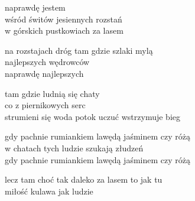 \begin{text}
    naprawdę jestem\\
    wśród świtów jesiennych rozstań\\
    w górskich pustkowiach za lasem

    na rozstajach dróg tam gdzie szlaki mylą\\
    najlepszych wędrowców\\
    naprawdę najlepszych

    tam gdzie ludnią się chaty\\
    co z piernikowych serc\\
    strumieni się woda potok uczuć wstrzymuje bieg

    gdy pachnie rumiankiem lawędą jaśminem czy różą\\
    w chatach tych ludzie szukają złudzeń\\
    gdy pachnie rumiankiem lawędą jaśminem czy różą

    lecz tam choć tak daleko za lasem to jak tu\\
    miłość kulawa jak ludzie
\end{text}
\begin{chord}

\end{chord}